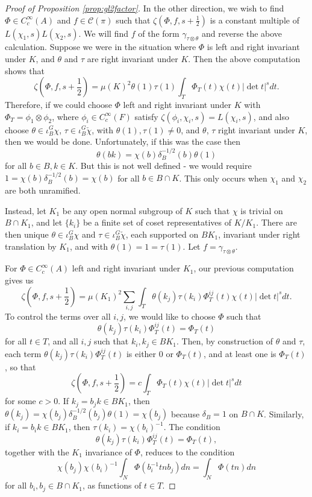 \begin{proof}[Proof of Proposition \ref{prop:gl2factor}]
    In the other direction, we wish to find $\Phi \in C_c^\infty(A)$ and $f \in \mathcal C(\pi)$ such that $\zeta(\Phi,f,s+\frac{1}{2})$ is a constant multiple of $L(\chi_1,s)L(\chi_2,s)$. We will find $f$ of the form $\gamma_{\tau \otimes \theta}$ and reverse the above calculation. Suppose we were in the situation where $\Phi$ is left and right invariant under $K$, and $\theta$ and $\tau$ are right invariant under $K$. Then the above computation shows that 
    $$\zeta\left(\Phi,f,s+\frac{1}{2}\right) = \mu(K)^2 \theta(1)\tau(1) \int_T \Phi_T(t)\chi(t)|\det t|^s dt.$$
    Therefore, if we could choose $\Phi$ left and right invariant under $K$ with $\Phi_T = \phi_1\otimes \phi_2$, where $\phi_i \in C_c^\infty(F)$ satisfy $\zeta(\phi_i,\chi_i,s)=L(\chi_i,s)$, and also choose $\theta \in \iota_B^G \chi$, $\tau \in \iota_B^G \check{\chi}$, with $\theta(1), \tau(1) \neq 0$, and $\theta$, $\tau$ right invariant under $K$, then we would be done. Unfortunately, if this was the case then $$\theta(bk) = \chi(b) \delta_B^{-1/2}(b) \theta(1)$$ for all $b \in B, k \in K$. But this is not well defined - we would require $1=\chi(b)\delta_B^{-1/2}(b) = \chi(b)$ for all $b \in B \cap K$. This only occurs when $\chi_1$ and $\chi_2$ are both unramified.

    Instead, let $K_1$ be any open normal subgroup of $K$ such that $\chi$ is trivial on $B \cap K_1$, and let $\{k_i\}$ be a finite set of coset representatives of $K/K_1$. There are then unique $\theta \in \iota_B^G \chi$ and $\tau \in \iota_B^G \check{\chi}$, each supported on $BK_1$, invariant under right translation by $K_1$, and with $\theta(1)=1=\tau(1)$. Let $f=\gamma_{\tau \otimes \theta}$.
    
    For $\Phi \in C_c^\infty(A)$ left and right invariant under $K_1$, our previous computation gives us
    $$\zeta\left(\Phi,f,s+\frac{1}{2}\right) = \mu(K_1)^2 \sum\limits_{i,j}  \int_T \theta(k_j)\tau(k_i)\Phi_T^{ij}(t)\chi(t)|\det t|^s dt.
    $$
    To control the terms over all $i,j$, we would like to choose $\Phi$ such that 
    $$\theta(k_j)\tau(k_i)\Phi_T^{ij}(t) = \Phi_T(t)$$
    for all $t \in T$, and all $i,j$ such that $k_i,k_j \in BK_1$. Then, by construction of $\theta$ and $\tau$, each term $\theta(k_j)\tau(k_i)\Phi_T^{ij}(t)$ is either 0 or $\Phi_T(t)$, and at least one is $\Phi_T(t)$, so that
    $$\zeta(\Phi,f,s+\frac{1}{2}) = c \int_T \Phi_T(t) \chi(t) |\det t|^s dt$$ for some $c>0$. If $k_j = b_jk \in BK_1$, then $\theta(k_j) = \chi(b_j)\delta_B^{-1/2}(b_j)\theta(1) = \chi(b_j)$ because $\delta_B=1$ on $B \cap K$. Similarly, if $k_i=b_ik \in BK_1$, then $\tau(k_i)=\chi(b_i)^{-1}$. The condition $$\theta(k_j)\tau(k_i)\Phi_T^{ij}(t) = \Phi_T(t),$$ together with the $K_1$ invariance of $\Phi$, reduces to the condition
    $$\chi(b_j)\chi(b_i)^{-1} \int_N \Phi(b_i^{-1}tnb_j) dn = \int_N \Phi(tn)dn$$ for all $b_i,b_j \in B \cap K_1$, as functions of $t \in T$.


\end{proof}
